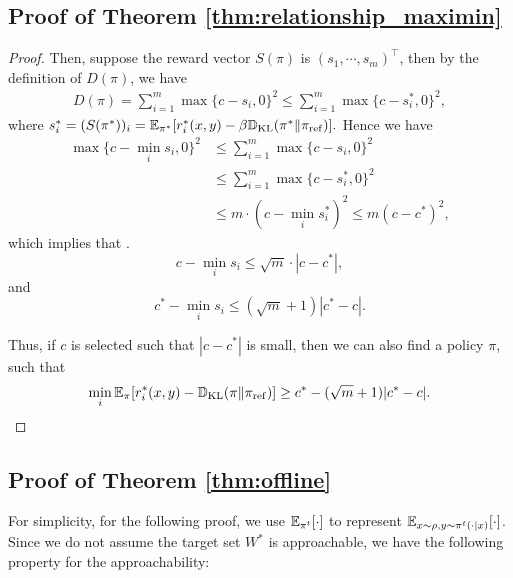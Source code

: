 \subsection{Proof of Theorem \ref{thm:relationship_maximin}}\label{app:proof maxmin}

\begin{proof}
    Then, suppose the reward vector $S(\pi)$ is $(s_1,\cdots, s_m)^\top$, then by the definition of $D(\pi)$, we have 
    \begin{align*}
        D(\pi) = \sum_{i=1}^m \max\{c-s_i,0\}^2\le \sum_{i=1}^m \max\{c-s_i^*,0\}^2,
    \end{align*}
    where $s_i^* = (S(\pi^*))_i = \mathbb{E}_{\pi^*}[r_i^*(x,y) - \beta\mathbb{D}_{\mathrm{KL}}(\pi^*\|\pi_{\mathrm{ref}})].$
    Hence we have 
    \begin{align*}\max\{c-\min_i s_i,0\}^2&\le  \sum_{i=1}^m \max\{c-s_i,0\}^2\\&\le \sum_{i=1}^m \max\{c-s_i^*,0\}^2\\&\le m\cdot (c-\min_i s_i^*)^2\le m(c-c^*)^2,\end{align*}
which implies that .
    $$c-\min_i s_i \le \sqrt{m}\cdot |c-c^*|,$$ and 
    $$c^*-\min_i s_i \le (\sqrt{m}+1) |c^*-c|.$$
 

    Thus, if $c$ is selected such that $|c-c^*|$ is small, then we can also find a policy $\pi$, such that $$\min_i \mathbb{E}_\pi[r_i^*(x,y) - \mathbb{D}_{\mathrm{KL}}(\pi \| \pi_{\mathrm{ref}})] \ge c^*-(\sqrt{m}+1) |c^*-c|.$$
    \end{proof}

\subsection{Proof of Theorem \ref{thm:offline}}

For simplicity, for the following proof, we use $\mathbb{E}_{\pi^t}[\cdot]$ to represent $\mathbb{E}_{x\sim \rho, y\sim \pi^t(\cdot \mid x)}[\cdot]$.
Since we do not assume the target set $W^*$ is approachable, we have the following property for the approachability:

